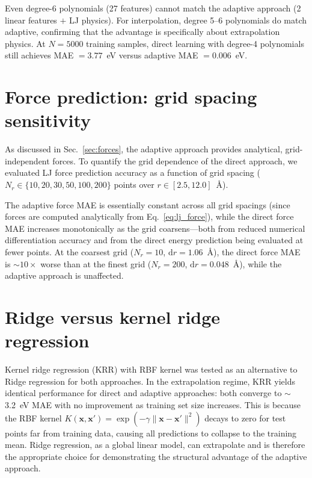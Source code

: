 \documentclass[aps,prb,twocolumn,superscriptaddress,longbibliography,floatfix]{revtex4-2}
\begin{document}
Even degree-6 polynomials (27 features) cannot match the adaptive approach (2 linear features $+$ LJ physics). For interpolation, degree 5--6 polynomials do match adaptive, confirming that the advantage is specifically about extrapolation physics. At $N = 5000$ training samples, direct learning with degree-4 polynomials still achieves MAE $= 3.77$~eV versus adaptive MAE $= 0.006$~eV.


\section{Force prediction: grid spacing sensitivity}
\label{app:forces}

As discussed in Sec.~\ref{sec:forces}, the adaptive approach provides analytical, grid-independent forces. To quantify the grid dependence of the direct approach, we evaluated LJ force prediction accuracy as a function of grid spacing ($N_r \in \{10, 20, 30, 50, 100, 200\}$ points over $r \in [2.5, 12.0]$~\AA).

The adaptive force MAE is essentially constant across all grid spacings (since forces are computed analytically from Eq.~\eqref{eq:lj_force}), while the direct force MAE increases monotonically as the grid coarsens---both from reduced numerical differentiation accuracy and from the direct energy prediction being evaluated at fewer points. At the coarsest grid ($N_r = 10$, $\mathrm{d}r = 1.06$~\AA), the direct force MAE is $\sim$$10\times$ worse than at the finest grid ($N_r = 200$, $\mathrm{d}r = 0.048$~\AA), while the adaptive approach is unaffected.


\section{Ridge versus kernel ridge regression}
\label{app:krr}

Kernel ridge regression (KRR) with RBF kernel was tested as an alternative to Ridge regression for both approaches. In the extrapolation regime, KRR yields identical performance for direct and adaptive approaches: both converge to $\sim$3.2~eV MAE with no improvement as training set size increases. This is because the RBF kernel $K(\mathbf{x}, \mathbf{x}') = \exp(-\gamma\|\mathbf{x} - \mathbf{x}'\|^2)$ decays to zero for test points far from training data, causing all predictions to collapse to the training mean. Ridge regression, as a global linear model, can extrapolate and is therefore the appropriate choice for demonstrating the structural advantage of the adaptive approach.
\end{document}
